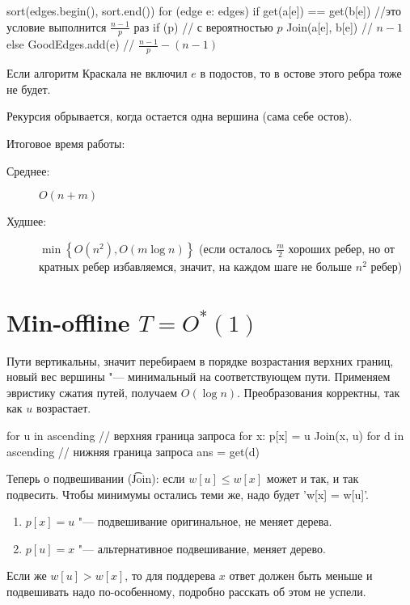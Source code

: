 \begin{cppcode}
sort(edges.begin(), sort.end())
for (edge e: edges) {
	if get(a[e]) == get(b[e]) //это условие выполнится $\frac{n - 1}{p}$ раз
		if (p) // с вероятностью $p$
			Join(a[e], b[e]) // $n - 1$
		else
			GoodEdges.add(e) // $\frac{n - 1}{p} - (n - 1)$
}
\end{cppcode}

\begin{Rem}
	Если алгоритм Краскала не включил $e$ в подостов, то в остове этого ребра тоже не будет.
\end{Rem}
\begin{Rem}
	Рекурсия обрывается, когда остается одна вершина (сама себе остов).
\end{Rem}

Итоговое время работы:
\begin{description}
\item[Среднее:]
	$O(n + m)$

\item[Худшее:]
	$\min\left\{O\left(n^2\right), O(m \log n)\right\}$
	(если осталось $\frac{m}{2}$ хороших ребер, но от кратных ребер избавляемся, значит, на каждом шаге не больше $n^2$ ребер)
\end{description}

\section{Min-offline \texorpdfstring{$T =  O^*(1)$}{T = O*(1)}}


Пути вертикальны, значит перебираем в порядке возрастания верхних границ, новый вес вершины "--- минимальный на соответствующем пути.
Применяем эвристику сжатия путей, получаем $O(\log n)$.
Преобразования корректны, так как $u$ возрастает.

\begin{cppcode}
for u in ascending // верхняя граница запроса
	for x: p[x] = u
		Join(x, u)
	for d in ascending // нижняя граница запроса
		ans = get(d)
\end{cppcode}

Теперь о подвешивании (\t{Join}): если $w[u] \le w[x]$ может и так, и так подвесить.
Чтобы минимумы остались теми же, надо будет \cpp'w[x] = w[u]'.

\begin{enumerate}
	\item $p[x] = u$ "--- подвешивание оригинальное, не меняет дерева.
	\item $p[u] = x$ "--- альтернативное подвешивание, меняет дерево.
\end{enumerate}

Если же $w[u] > w[x]$, то для поддерева $x$ ответ должен быть меньше и подвешивать надо по-особенному, подробно расскать об этом не успели.

